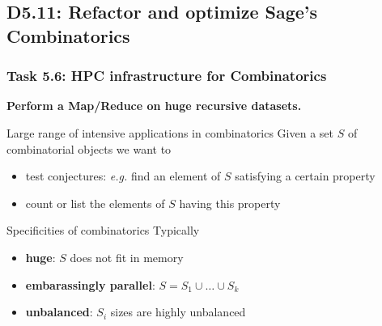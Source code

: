 \documentclass{beamer}
\begin{document}
\subsection{D5.11: Refactor and optimize Sage's Combinatorics}
\begin{frame}
  \frametitle{Task 5.6: HPC infrastructure for Combinatorics}

  \begin{center}
    {\bf \large
      Perform a Map/Reduce on huge recursive datasets.
    }
  \end{center}

  \begin{block}{Large range of intensive applications in combinatorics}
    Given a set $S$ of combinatorial objects we want to
    \begin{itemize}
    \item test conjectures: \textit{e.g.} find an element of $S$ satisfying a certain
      property
    \item count or list the elements of $S$ having this property
    \end{itemize}
  \end{block}

  \begin{block}{Specificities of combinatorics}
  Typically
    \begin{itemize}
    \item \textbf{huge}: $S$ does not fit in memory
    \item \textbf{embarassingly parallel}: $S = S_1 \cup \ldots \cup S_k$
    \item \textbf{unbalanced}: $S_i$ sizes are highly unbalanced
    \end{itemize}
  \end{block}
\end{frame}
\end{document}

